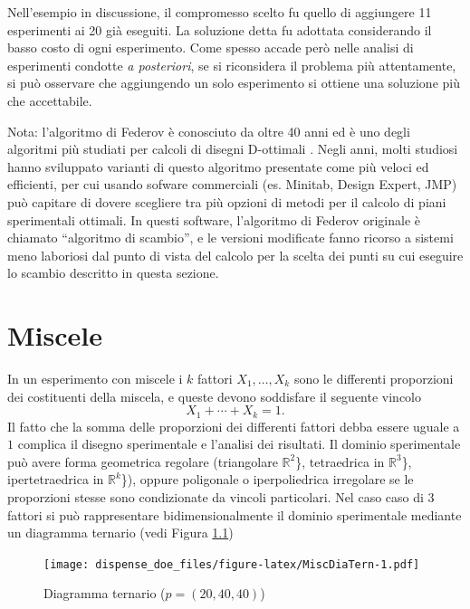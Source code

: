 \documentclass[
  11pt,
]{book}
\begin{document}
Nell'esempio in discussione, il compromesso scelto fu quello di aggiungere 11 esperimenti ai 20 già eseguiti. La soluzione detta fu adottata considerando il basso costo di ogni esperimento. Come spesso accade però nelle analisi di esperimenti condotte \emph{a posteriori}, se si riconsidera il problema più attentamente, si può osservare che aggiungendo un solo esperimento si ottiene una soluzione più che accettabile.

Nota: l'algoritmo di Federov è conosciuto da oltre 40 anni ed è uno degli algoritmi più studiati per calcoli di disegni D-ottimali \citep{v.v.federov1972}. Negli anni, molti studiosi hanno sviluppato varianti di questo algoritmo presentate come più veloci ed efficienti, per cui usando sofware commerciali (es. Minitab, Design Expert, JMP) può capitare di dovere scegliere tra più opzioni di metodi per il calcolo di piani sperimentali ottimali. In questi software, l'algoritmo di Federov originale è chiamato ``algoritmo di scambio'', e le versioni modificate fanno ricorso a sistemi meno laboriosi dal punto di vista del calcolo per la scelta dei punti su cui eseguire lo scambio descritto in questa sezione.

\hypertarget{miscele}{%
\chapter{Miscele}\label{miscele}}

In un esperimento con miscele i \(k\) fattori \(X_1, \dots, X_k\) sono le differenti proporzioni dei costituenti della miscela, e queste devono soddisfare il seguente vincolo
\begin{equation}
    X_1+\cdots+X_k=1.
    \label{eq:VinMisc}
 \end{equation}
Il fatto che la somma delle proporzioni dei differenti fattori debba essere uguale a \(1\) complica il disegno sperimentale e l'analisi dei risultati. Il dominio sperimentale può avere forma geometrica regolare (triangolare \(\mathbb{R}^2\)\}, tetraedrica in \(\mathbb{R}^3\)\}, ipertetraedrica in \(\mathbb{R}^k\)\}), oppure poligonale o iperpoliedrica irregolare se le proporzioni stesse sono condizionate da vincoli particolari.
Nel caso caso di \(3\) fattori si può rappresentare bidimensionalmente il dominio sperimentale mediante un diagramma ternario (vedi Figura \ref{fig:MiscDiaTern})

\begin{figure}
\centering
\texttt{[image: dispense\_doe\_files/figure-latex/MiscDiaTern-1.pdf]}
\caption{\label{fig:MiscDiaTern}Diagramma ternario (\(p=(20,40,40)\))}
\end{figure}
\end{document}
